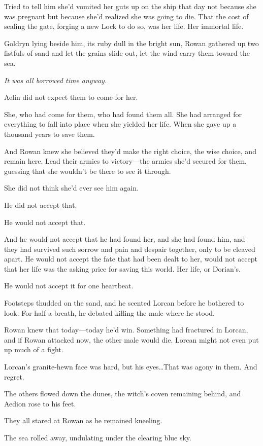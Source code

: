 Tried to tell him she'd vomited her guts up on the ship that day not because she was pregnant but because she'd realized she was going to die.
That the cost of sealing the gate, forging a new Lock to do so, was her life.
Her immortal life.

Goldryn lying beside him, its ruby dull in the bright sun, Rowan gathered up two fistfuls of sand and let the grains slide out, let the wind carry them toward the sea.

\emph{It was all borrowed time anyway.}

Aelin did not expect them to come for her.

She, who had come for them, who had found them all.
She had arranged for everything to fall into place when she yielded her life.
When she gave up a thousand years to save them.

And Rowan knew she believed they'd make the right choice, the wise choice, and remain here.
Lead their armies to victory---the armies she'd secured for them, guessing that she wouldn't be there to see it through.

She did not think she'd ever see him again.

He did not accept that.

He would not accept that.

And he would not accept that he had found her, and she had found him, and they had survived such sorrow and pain and despair together, only to be cleaved apart.
He would not accept the fate that had been dealt to her, would not accept that her life was the asking price for saving this world.
Her life, or Dorian's.

He would not accept it for one heartbeat.

Footsteps thudded on the sand, and he scented Lorcan before he bothered to look.
For half a breath, he debated killing the male where he stood.

Rowan knew that today---today he'd win.
Something had fractured in Lorcan, and if Rowan attacked now, the other male would die.
Lorcan might not even put up much of a fight.

Lorcan's granite-hewn face was hard, but his eyes\ldots That was agony in them.
And regret.

The others flowed down the dunes, the witch's coven remaining behind, and Aedion rose to his feet.

They all stared at Rowan as he remained kneeling.

The sea rolled away, undulating under the clearing blue sky.

